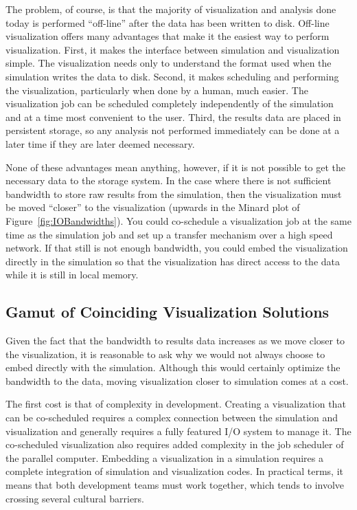 \documentclass[conference]{IEEEtran}
\begin{document}
The problem, of course, is that the majority of visualization and analysis
done today is performed ``off-line'' after the data has been written to
disk.  Off-line visualization offers many advantages that make it the
easiest way to perform visualization.  First, it makes the interface
between simulation and visualization simple.  The visualization needs only
to understand the format used when the simulation writes the data to disk.
Second, it makes scheduling and performing the visualization, particularly
when done by a human, much easier.  The visualization job can be scheduled
completely independently of the simulation and at a time most convenient
to the user.  Third, the results data are placed in persistent storage, so
any analysis not performed immediately can be done at a later time if they
are later deemed necessary.

None of these advantages mean anything, however, if it is not possible to
get the necessary data to the storage system.  In the case where there is
not sufficient bandwidth to store raw results from the simulation, then the
visualization must be moved ``closer'' to the visualization (upwards in the
Minard plot of Figure~\ref{fig:IOBandwidths}).  You could co-schedule a
visualization job at the same time as the simulation job and set up a
transfer mechanism over a high speed network.  If that still is not enough
bandwidth, you could embed the visualization directly in the simulation so
that the visualization has direct access to the data while it is still in
local memory.

\subsection{Gamut of Coinciding Visualization Solutions}

\noindent
Given the fact that the bandwidth to results data increases as we move
closer to the visualization, it is reasonable to ask why we would not
always choose to embed directly with the simulation.  Although this would
certainly optimize the bandwidth to the data, moving visualization closer
to simulation comes at a cost.

The first cost is that of complexity in development.  Creating a
visualization that can be co-scheduled requires a complex connection
between the simulation and visualization and generally requires a fully
featured I/O system to manage it.  The co-scheduled visualization also
requires added complexity in the job scheduler of the parallel computer.
Embedding a visualization in a simulation requires a complete integration
of simulation and visualization codes.  In practical terms, it means that
both development teams must work together, which tends to involve crossing
several cultural barriers.
\end{document}
